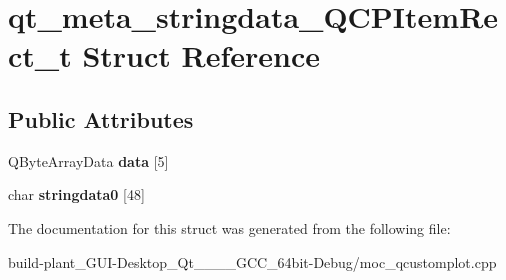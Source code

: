 \hypertarget{structqt__meta__stringdata__QCPItemRect__t}{}\section{qt\+\_\+meta\+\_\+stringdata\+\_\+\+Q\+C\+P\+Item\+Rect\+\_\+t Struct Reference}
\label{structqt__meta__stringdata__QCPItemRect__t}
\subsection*{Public Attributes}
\begin{DoxyCompactItemize}
\item 
\mbox{\label{structqt__meta__stringdata__QCPItemRect__t_ab5a84b5db36cb982466a0b732f5e090f}} 
Q\+Byte\+Array\+Data {\bfseries data} \mbox{[}5\mbox{]}
\item 
\mbox{\label{structqt__meta__stringdata__QCPItemRect__t_a216a9c8bff154ce0d04ce8eb79a5d408}} 
char {\bfseries stringdata0} \mbox{[}48\mbox{]}
\end{DoxyCompactItemize}


The documentation for this struct was generated from the following file\+:\begin{DoxyCompactItemize}
\item 
build-\/plant\+\_\+\+G\+U\+I-\/\+Desktop\+\_\+\+Qt\+\_\+\_\+\_\+\_\+\+G\+C\+C\+\_\+64bit-\/\+Debug/moc\+\_\+qcustomplot.\+cpp\end{DoxyCompactItemize}
